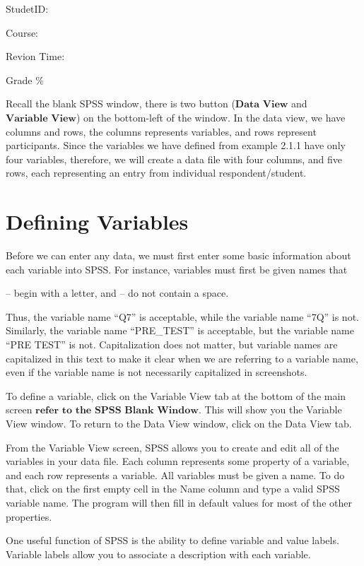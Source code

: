 \documentclass[
]{book}
\begin{document}
StudetID:

Course:

Revion Time:

Grade \%

Recall the blank SPSS window, there is two button (\(\textbf{Data View}\) and \(\textbf{Variable View}\)) on the bottom-left of the window. In the data view, we have columns and rows, the columns represents variables, and rows represent participants. Since the variables we have defined from example 2.1.1 have only four variables, therefore, we will create a data file with four columns, and five rows, each representing an entry from individual respondent/student.

\hypertarget{defining-variables}{%
\section{Defining Variables}\label{defining-variables}}

Before we can enter any data, we must first enter some basic information about each variable into SPSS. For instance, variables must first be given names that

-- begin with a letter, and
-- do not contain a space.

Thus, the variable name ``Q7'' is acceptable, while the variable name ``7Q'' is not. Similarly, the variable name ``PRE\_TEST'' is acceptable, but the variable name ``PRE TEST'' is not. Capitalization does not matter, but variable names are capitalized in this text to make it clear when we are referring to a variable name, even if the variable name is not necessarily capitalized in screenshots.

To define a variable, click on the Variable View tab at the bottom of the main screen \(\textbf{refer to the SPSS Blank Window}\). This will show you the Variable View window. To return to the Data View window, click on the Data View tab.

From the Variable View screen, SPSS allows you to create and edit all of the variables in your data file. Each column represents some property of a variable, and each row represents a variable. All variables must be given a name. To do that, click on the first empty cell in the Name column and type a valid SPSS variable name. The program will then fill in default values for most of the other properties.

One useful function of SPSS is the ability to define variable and value labels. Variable labels allow you to associate a description with each variable.
\end{document}
